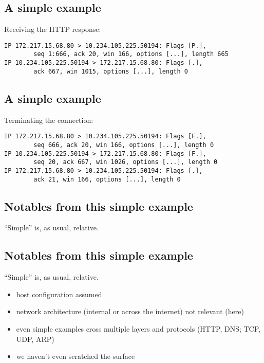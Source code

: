 \documentclass[xga]{xdvislides}
\begin{document}
\subsection{A simple example}
Receiving the HTTP response:
\begin{verbatim}
IP 172.217.15.68.80 > 10.234.105.225.50194: Flags [P.],
        seq 1:666, ack 20, win 166, options [...], length 665
IP 10.234.105.225.50194 > 172.217.15.68.80: Flags [.],
        ack 667, win 1015, options [...], length 0
\end{verbatim}

\subsection{A simple example}
Terminating the connection:
\begin{verbatim}
IP 172.217.15.68.80 > 10.234.105.225.50194: Flags [F.],
        seq 666, ack 20, win 166, options [...], length 0
IP 10.234.105.225.50194 > 172.217.15.68.80: Flags [F.],
        seq 20, ack 667, win 1026, options [...], length 0
IP 172.217.15.68.80 > 10.234.105.225.50194: Flags [.],
        ack 21, win 166, options [...], length 0
\end{verbatim}

\subsection{Notables from this simple example}
``Simple'' is, as usual, relative.

\subsection{Notables from this simple example}
``Simple'' is, as usual, relative.
\\

\begin{itemize}
	\item host configuration assumed
	\item network architecture (internal or across the internet) not
			relevant (here)
	\item even simple examples cross multiple layers and protocols
			(HTTP, DNS; TCP, UDP, ARP)
	\item we haven't even scratched the surface
\end{itemize}
\end{document}
